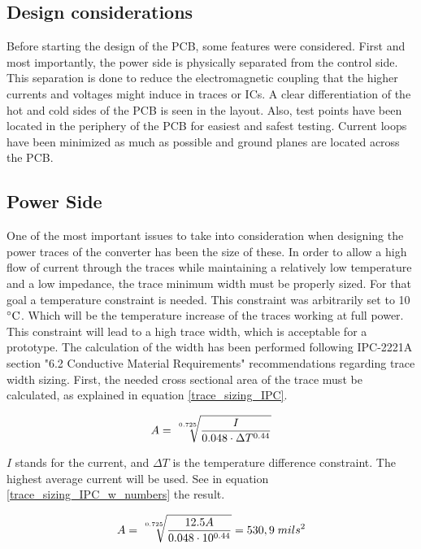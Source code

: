 \subsection{Design considerations} \label{PCB_Considerations}
Before starting the design of the PCB, some features were considered. First and most importantly, the power side is physically separated from the control side. This separation is done to reduce the electromagnetic coupling that the higher currents and voltages might induce in traces or ICs. A clear differentiation of the hot and cold sides of the PCB is seen in the layout.  Also, test points have been located in the periphery of the PCB for easiest and safest testing. Current loops have been minimized as much as possible and ground planes are located across the PCB.

\subsection{Power Side} \label{PCB_Power}
One of the most important issues to take into consideration when designing the power traces of the converter has been the size of these. In order to allow a high flow of current through the traces while maintaining a relatively low temperature and a low impedance, the trace minimum width must be properly sized. For that goal a temperature constraint is needed. This constraint was arbitrarily set to 10 $\decC$. Which will be the temperature increase of the traces working at full power. This constraint will lead to a high trace width, which is acceptable for a prototype.
The calculation of the width has been performed following IPC-2221A section "6.2 Conductive Material Requirements" recommendations regarding trace width sizing. First, the needed cross sectional area of the trace must be calculated, as explained in equation \ref{trace_sizing_IPC}.

\begin{equation} \label{trace_sizing_IPC}
A = \sqrt[\leftroot{-2}\uproot{2}0.725]{\frac{I}{0.048\cdot \Delta T^{0.44}}}
\end{equation}

 $I$ stands for the current, and $\Delta T$ is the temperature difference constraint. The highest average current will be used. See in equation \ref{trace_sizing_IPC_w_numbers} the result.
 
 \begin{equation} \label{trace_sizing_IPC_w_numbers}
 A = \sqrt[\leftroot{-2}\uproot{2}0.725]{\frac{12.5 A}{0.048\cdot 10^{0.44}}} = 530,9 \; mils^2
 \end{equation}
 
